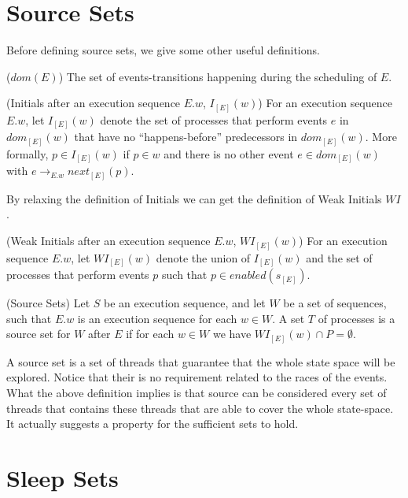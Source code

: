
\section{Source Sets}

Before defining source sets, we give some other useful definitions.

\begin{definition}{($dom(E)$)}
    The set of events-transitions happening during the scheduling of $E$.
\end{definition}

\begin{definition}{(Initials after an execution sequence $E.w$, $I_{[E]}(w)$)}
For an execution sequence $E.w$, let $I_{[E]}(w)$ denote the set of
processes that perform events $e$ in $dom_{[E]}(w)$ that have no
“happens-before” predecessors in $dom_{[E]}(w)$. More formally,
$p \in I_{[E]}(w)$ if $p \in w$ and there is no other event $e \in dom_{[E]}(w)$ with
$e \rightarrow_{E.w} next_{[E]}(p)$.
\end{definition}

By relaxing the definition of Initials we can get the definition of Weak Initials $WI$.


\begin{definition}{(Weak Initials after an execution sequence $E.w$, $WI_{[E]}(w)$)}
For an execution sequence $E.w$, let $WI_{[E]}(w)$ denote the union of $I_{[E]}(w)$ and the set of
processes that perform events $p$ such that $p \in enabled(s_{[E]}) $.
\end{definition}

\begin{definition}{(Source Sets)}
Let $S$ be an execution sequence,
and let $W$ be a set of sequences, such that $E.w$ is an execution
sequence for each $w \in W$. A set $T$ of processes is a source set for
$W$ after $E$ if for each $w \in W$ we have $WI_{[E]}(w) \cap P  = \emptyset$.
\end{definition}

A source set is a set of threads that guarantee that the whole state space will be explored. 
Notice that their is no requirement related to the races
of the events.
What the above definition implies is that source can be considered every set of threads that contains these threads 
that are able to cover the whole state-space.
It actually suggests a property for the sufficient sets to hold.

\section{Sleep Sets}

